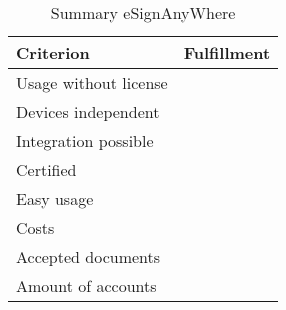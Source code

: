 \begin{table}[h]
	\begin{tabular}{|p{4cm}|p{10cm}|} \hline
		Criterion & Fulfillment \\ \hline
		Usage without license & \\ \hline
		Devices independent & \\ \hline
		Integration possible & \\ \hline
		Certified & \\ \hline
		Easy usage & \\ \hline
		Costs & \\ \hline
		Accepted documents & \\ \hline
		Amount of accounts & \\ \hline
	\end{tabular}
	\caption{Summary eSignAnyWhere}
	\label{tab:esignany}
\end{table}

